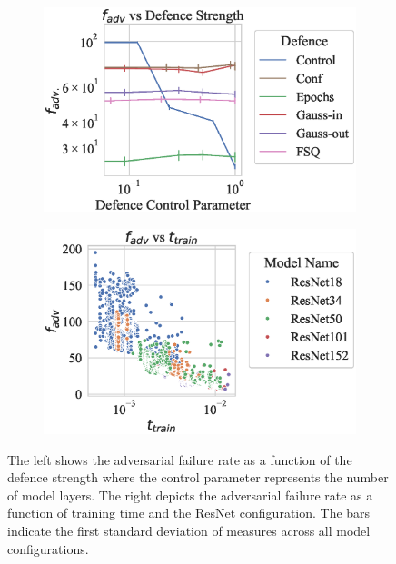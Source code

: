 \begin{figure}[!h]
    \begin{subfigure}
        \centering
        \includegraphics[trim={0 10pt 0 10pt},clip,width=.48\textwidth]{cifar/def_param_vs_adv_failure_rate.eps}
    \end{subfigure}
    \begin{subfigure}
        \centering
        \includegraphics[trim={0 10pt 0 10pt},clip,width=.48\textwidth]{cifar/adv_failure_rate_vs_train_time.eps}
    \end{subfigure}
    \caption{The left shows the adversarial failure rate as a function of the defence strength where the control parameter represents the number of model layers. The right depicts the adversarial failure rate as a function of training time and the ResNet configuration. The bars indicate the first standard deviation of measures across all model configurations.}
    \label{fig:cifar_failure_rate}
\end{figure}

